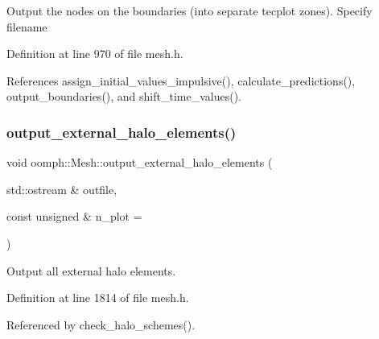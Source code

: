 Output the nodes on the boundaries (into separate tecplot zones). Specify filename 

Definition at line 970 of file mesh.\+h.



References assign\+\_\+initial\+\_\+values\+\_\+impulsive(), calculate\+\_\+predictions(), output\+\_\+boundaries(), and shift\+\_\+time\+\_\+values().

\mbox{\label{classoomph_1_1Mesh_a1bf4b7961c46409b20b33083d7537eba}} 
\subsubsection{\texorpdfstring{output\+\_\+external\+\_\+halo\+\_\+elements()}{output\_external\_halo\_elements()}\hspace{0.1cm}{\footnotesize\ttfamily [1/2]}}
{\footnotesize\ttfamily void oomph\+::\+Mesh\+::output\+\_\+external\+\_\+halo\+\_\+elements (\begin{DoxyParamCaption}\item[{std\+::ostream \&}]{outfile,  }\item[{const unsigned \&}]{n\+\_\+plot = {} }\end{DoxyParamCaption})\hspace{0.3cm}{\ttfamily [inline]}}



Output all external halo elements. 



Definition at line 1814 of file mesh.\+h.



Referenced by check\+\_\+halo\+\_\+schemes().

\mbox{\label{classoomph_1_1Mesh_a627b80ad5ef71a660ee7760735c0486a}} 
